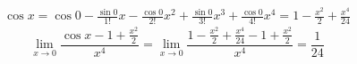 \documentclass[../rgr1.tex]{subfiles}
\begin{document}


\Solution

\begin{align}
	\cos x
	=\cos 0
	-\frac{\sin 0}{1!}x
	-\frac{\cos 0}{2!}x^2
	+\frac{\sin 0}{3!}x^3
	+\frac{\cos 0}{4!}x^4
	= 1 -\frac{x^2}{2} + \frac{x^4}{24} %
\end{align}
\begin{equation}
	\lim_{x\to 0}\frac{\cos x-1+\frac{x^2}{2}}{x^4}
	=\lim_{x\to 0}\frac{1 -\frac{x^2}{2} + \frac{x^4}{24}-1+\frac{x^2}{2}}{x^4}
	= \frac{1}{24}
\end{equation}

\end{document}
